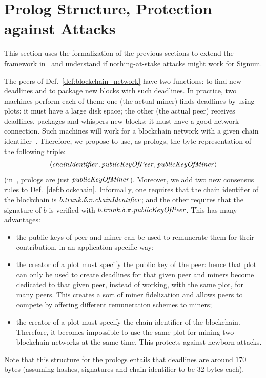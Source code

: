\section{Prolog Structure, Protection against Attacks}\label{sec:prolog_structure_attacks}
%
This section uses the formalization of the previous sections to
extend the framework in~\cite{SignumPlotting} and
understand if nothing-at-stake attacks might work for Signum.

The peers of Def.~\ref{def:blockchain_network} have two functions: to find new deadlines and to
package new blocks with such deadlines. In practice, two machines perform each of them:
one (the actual miner) finds deadlines by using plots: it must have a large disk space; the other (the actual peer)
receives deadlines, packages and whispers new blocks: it must have a good network connection.
Such machines will work for a blockchain network with a given chain identifier~\cite{Antonopoulos17}.
Therefore, we propose to use, as prologs, the byte representation of the following triple:
\[
\langle{\mathit{chainIdentifier}},{\mathit{publicKeyOfPeer}},{\mathit{publicKeyOfMiner}}\rangle
\]
(in~\cite{SignumPlotting}, prologs are just ${\mathit{publicKeyOfMiner}}$).
Moreover, we add two new consensus rules to Def.~\ref{def:blockchain}. Informally, one requires
that the chain identifier of the blockchain is $b.{\mathit{trunk}}.\delta.\pi.{\mathit{chainIdentifier}}$; and the other requires that
the signature of $b$ is verified with $b.{\mathit{trunk}}.\delta.\pi.{\mathit{publicKeyOfPeer}}$.
This has many advantages:
%
\begin{itemize}
\item the public keys of peer and miner can be used to remunerate them for their contribution,
  in an application-specific way;
\item the creator of a plot must specify the public key of the peer: hence that plot
  can only be used to create deadlines for that given peer and miners become dedicated to that given
  peer, instead of working, with the same plot, for many peers. This creates a sort of miner
  fidelization and allows peers to compete by offering different remuneration schemes to miners;
\item the creator of a plot must specify the chain identifier of the blockchain.
  Therefore, it becomes impossible to use the same plot for mining two
  blockchain networks at the same time. This protects against newborn attacks.
\end{itemize}
%
Note that this structure for the prologs entails that deadlines are around $170$ bytes
(assuming hashes, signatures and chain identifier to be $32$ bytes each).

